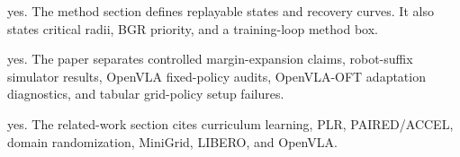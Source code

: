 \documentclass[letterpaper]{article}
\begin{document}
\begin{itemize}

yes. The method section defines replayable states and recovery curves. It also states critical radii, BGR priority, and a training-loop method box.

yes. The paper separates controlled margin-expansion claims, robot-suffix simulator results, OpenVLA fixed-policy audits, OpenVLA-OFT adaptation diagnostics, and tabular grid-policy setup failures.

yes. The related-work section cites curriculum learning, PLR, PAIRED/ACCEL, domain randomization, MiniGrid, LIBERO, and OpenVLA.

\end{itemize}
\end{document}
